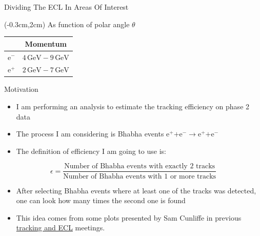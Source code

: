 \documentclass[8pt]{beamer}
\begin{document}
\begin{frame}{Dividing The ECL In Areas Of Interest}
	
	\pause[1]
	
	\begin{textblock*}{5cm}(-0.3cm,2cm)
	As function of polar angle $\theta$
	\begin{table}[h!]
		\centering
		\begin{tabular}{lc}
			&Momentum\\
			\hline
			$\textrm{e}^-$& $4\,\textrm{GeV} - 9\,\textrm{GeV}$\\	
			\pause[2]
			$\textrm{e}^+$& $2\,\textrm{GeV} - 7\,\textrm{GeV}$\\	
		\end{tabular}
		
	\end{table}
\end{textblock*}
\end{frame}











\begin{frame}{Motivation}

\begin{itemize}	
	\item I am performing an analysis to estimate the tracking efficiency on phase 2 data
	\item The process I am considering is Bhabha events $\textrm{e}^+ \textrm{+e}^- \rightarrow \textrm{e}^+ \textrm{+e}^- $ 
	\item The definition of efficiency I am going to use is:

\end{itemize}
	\begin{equation*}
		\epsilon = \frac{\textrm{Number of Bhabha events with exactly 2 tracks}}{\textrm{Number of Bhabha events with 1 or more tracks}}
	\end{equation*}
	
	\begin{itemize}
		\item After selecting Bhabha events where at least one of the tracks was detected, one can look how many times the second one is found
		\item  This idea comes from some plots presented by Sam Cunliffe in previous  \href{https://confluence.desy.de/display/BI/ECL+Meetings?preview=/84320165/109161400/SCunliffe181123-ECL.pdf}{tracking and ECL} meetings.
	\end{itemize}





\end{frame}
	
\end{document}
